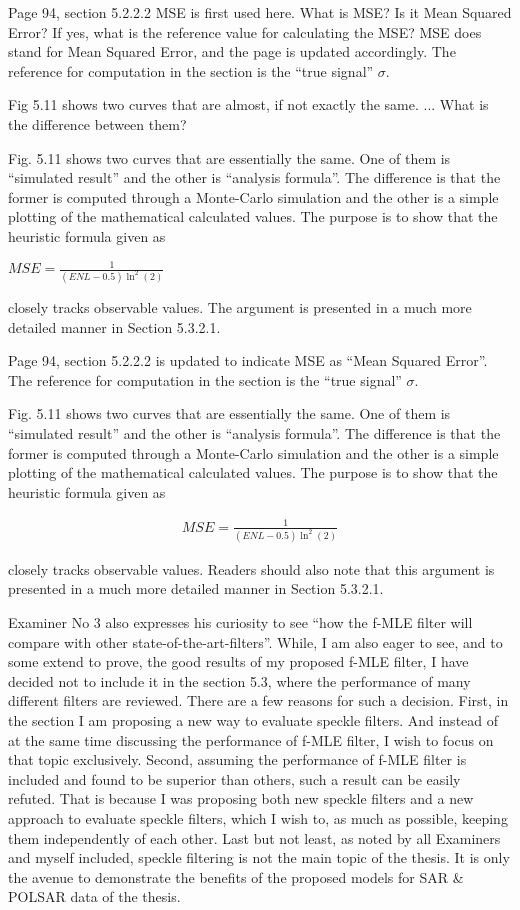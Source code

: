 \replyToComment
    {Page 94, section 5.2.2.2 MSE is first used here. What is MSE? Is it Mean Squared Error? If yes, what is the reference value for calculating the MSE?}
    {MSE does stand for Mean Squared Error, and the page is updated accordingly.
The reference for computation in the section is the ``true signal'' $\sigma$.
}

\replyToComment
    {Fig 5.11  shows two curves that are almost, if not exactly the same. ...
What is the difference between them?}
    {Fig. 5.11 shows two curves that are essentially the same.
One of them is ``simulated result'' and the other is ``analysis formula''.
The difference is that the former is computed through a Monte-Carlo simulation and the other is a simple plotting of the mathematical calculated values.
The purpose is to show that the heuristic formula given as

\begin{center}
  $MSE = \frac{1}{(ENL-0.5)\ln^2(2)}$
\end{center}  

closely tracks observable values.
The argument is presented in a much more detailed manner in Section 5.3.2.1.
}

Page 94, section 5.2.2.2 is updated to indicate MSE as ``Mean Squared Error''.
The reference for computation in the section is the ``true signal'' $\sigma$.

Fig. 5.11 shows two curves that are essentially the same.
One of them is ``simulated result'' and the other is ``analysis formula''.
The difference is that the former is computed through a Monte-Carlo simulation and the other is a simple plotting of the mathematical calculated values.
The purpose is to show that the heuristic formula given as

\begin{align*}
  MSE = \frac{1}{(ENL-0.5)\ln^2(2)}
\end{align*}  

closely tracks observable values.
Readers should also note that this argument is presented in a much more detailed manner in Section 5.3.2.1.

Examiner No 3 also expresses his curiosity to see ``how the f-MLE filter will compare with other state-of-the-art-filters''.
While, I am also eager to see, and to some extend to prove, the good results of my proposed f-MLE filter,
  I have decided not to include it in the section 5.3, where the performance of many different filters are reviewed.
There are a few reasons for such a decision.
First, in the section I am proposing a new way to evaluate speckle filters.
And instead of at the same time discussing the performance of f-MLE filter, I wish to focus on that topic exclusively.
Second, assuming the performance of f-MLE filter is included and found to be superior than others,
  such a result can be easily refuted.
That is because I was proposing both new speckle filters and a new approach to evaluate speckle filters,
  which I wish to, as much as possible, keeping them independently of each other.
Last but not least, as noted by all Examiners and myself included, speckle filtering is not the main topic of the thesis.
It is only the avenue to demonstrate the benefits of the proposed models for SAR \& POLSAR data of the thesis.

